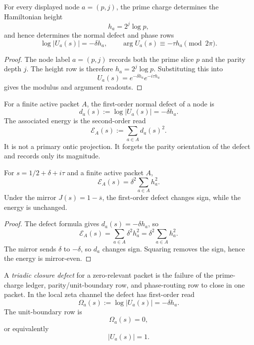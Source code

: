\begin{theorem}
\label{thm:unified-reality-prime-charge-determines-height-ledger}
For every displayed node $a=(p,j)$, the prime charge determines the
Hamiltonian height
$$
h_a=2^j\log p,
$$
and hence determines the normal defect and phase rows
$$
\log|U_a(s)|=-\delta h_a,
\qquad
\arg U_a(s)\equiv-\tau h_a\pmod{2\pi}.
$$
\end{theorem}

\begin{proof}
The node label $a=(p,j)$ records both the prime slice $p$ and the parity
depth $j$.  The height row is therefore $h_a=2^j\log p$.  Substituting
this into
$$
U_a(s)=e^{-\delta h_a}e^{-i\tau h_a}
$$
gives the modulus and argument readouts.
\end{proof}

\begin{definition}
\label{def:unified-reality-energy-derived-closure-defect-observable}
For a finite active packet $A$, the first-order normal defect of a node
is
$$
d_a(s):=\log|U_a(s)|=-\delta h_a.
$$
The associated energy is the second-order read
$$
\mathcal E_A(s):=\sum_{a\in A}d_a(s)^2.
$$
It is not a primary ontic projection.  It forgets the parity orientation
of the defect and records only its magnitude.
\end{definition}

\begin{theorem}
\label{thm:unified-reality-energy-square-triadic-closure-failure}
For $s=1/2+\delta+i\tau$ and a finite active packet $A$,
$$
\mathcal E_A(s)
=
\delta^2\sum_{a\in A}h_a^2.
$$
Under the mirror $J(s)=1-\overline{s}$, the first-order defect changes
sign, while the energy is unchanged.
\end{theorem}

\begin{proof}
The defect formula gives $d_a(s)=-\delta h_a$, so
$$
\mathcal E_A(s)=\sum_{a\in A}\delta^2h_a^2
=
\delta^2\sum_{a\in A}h_a^2.
$$
The mirror sends $\delta$ to $-\delta$, so $d_a$ changes sign.  Squaring
removes the sign, hence the energy is mirror-even.
\end{proof}

\begin{definition}
\label{def:unified-reality-triadic-closure-defect}
A \emph{triadic closure defect} for a zero-relevant packet is the
failure of the prime-charge ledger, parity/unit-boundary row, and
phase-routing row to close in one packet.  In the local zeta channel the
defect has first-order read
$$
\Omega_a(s):=\log|U_a(s)|=-\delta h_a.
$$
The unit-boundary row is
$$
\Omega_a(s)=0,
$$
or equivalently
$$
|U_a(s)|=1.
$$
\end{definition}

